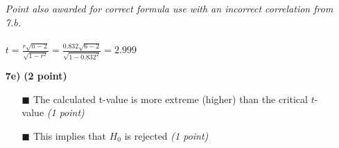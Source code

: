 \begin{itemize}
\textit{Point also awarded for correct formula use with an incorrect correlation from 7.b.} \\ \\ 
$t = \frac{r \sqrt{n - 2}}{\sqrt{1 - r^2}} = \frac{0.832 \sqrt{6 - 2}}{\sqrt{1 - 0.832^2}} = 2.999$ \\
\item[\textbf{7e)}] \textbf{(2 point)} \\
        \begin{itemize}
        \item[$\blacksquare$] The calculated t-value is more extreme (higher) than the critical $t$-value \textit{(1 point)}
        \item[$\blacksquare$] This implies that $H_0$ is rejected \textit{(1 point)}
        \end{itemize}
\end{itemize}

\normalfont

\clearpage %